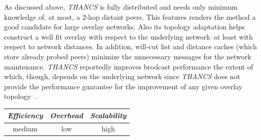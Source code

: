%
%
%

As discussed above, \emph{THANCS} is fully distributed and needs only minimum knowledge
of, at most, a $2$-hop distant peers. This features renders 
the method a good candidate for large overlay networks.
Also its topology adaptation helps construct a well fit overlay
with respect to the underlying network--at least with respect to network
distances. In addition, will-cut list and distance caches (which store already
probed peers) minimize the unnecessary messages for the network maintenance.
\emph{THANCS} reportedly improves brodcast performance the extent of which, though,
depends on the underlying network since \emph{THANCS} does not provide the
performance guarantee for the improvement of any given overlay topology~\cite{HLY2010}.

\begin{center}
{\footnotesize
\begin{tabular}{ccc}
\emph{Efficiency} & \emph{Overhead} & \emph{Scalability} \\
\hline
% 
medium &
low &
high
\end{tabular}
}
\end{center}

